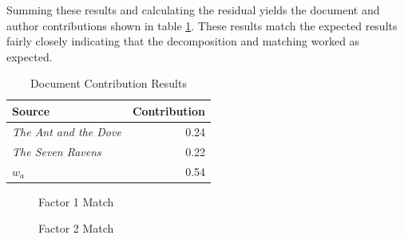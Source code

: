\documentclass{article}
\begin{document}
Summing these results and calculating the residual yields the document
and author contributions shown in table \ref{tab:docresults}.  These
results match the expected results fairly closely indicating that the
decomposition and matching worked as expected.

\begin{table}
    \begin{tabular}{l|r}
        {\bf Source} & {\bf Contribution} \\
        \hline
        {\em The Ant and the Dove} & 0.24 \\
        {\em The Seven Ravens} & 0.22 \\
        $w_a$ & 0.54
    \end{tabular}
    \caption{Document Contribution Results}
    \label{tab:docresults}
\end{table}

\begin{figure}%
    \centering
    \qquad
    \caption{Factor 1 Match}%
    \label{fig:com1}%
\end{figure}

\begin{figure}%
    \centering
    \qquad
    \caption{Factor 2 Match}%
    \label{fig:com2}%
\end{figure}
\end{document}
